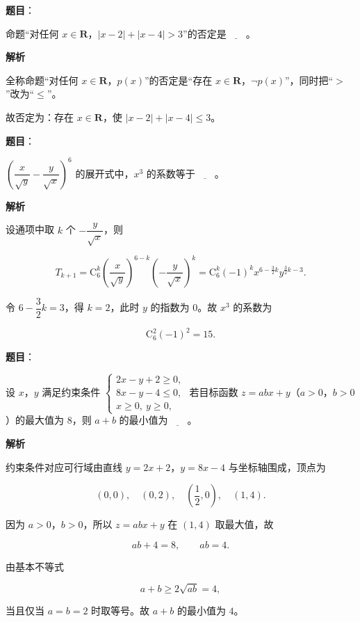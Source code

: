 \begin{answer}

\textbf{题目}：

命题“对任何 $x\in\mathbf R$，$|x-2|+|x-4|>3$”的否定是$\underline{\qquad}$。

\textbf{解析}

全称命题“对任何 $x\in\mathbf R$，$p(x)$”的否定是“存在 $x\in\mathbf R$，$\lnot p(x)$”，同时把“$>$”改为“$\leqslant$”。

故否定为：存在 $x\in\mathbf R$，使 $|x-2|+|x-4|\leqslant3$。


\end{answer}
\begin{answer}

\textbf{题目}：

$\left(\dfrac{x}{\sqrt y}-\dfrac{y}{\sqrt x}\right)^6$ 的展开式中，$x^3$ 的系数等于$\underline{\qquad}$。

\textbf{解析}

设通项中取 $k$ 个 $-\dfrac{y}{\sqrt x}$，则

\nopagebreak[4]
\[T_{k+1}=\mathrm C_6^k\left(\frac{x}{\sqrt y}\right)^{6-k}\left(-\frac{y}{\sqrt x}\right)^k
=\mathrm C_6^k(-1)^k x^{6-\frac32k}y^{\frac32k-3}.\]

令 $6-\dfrac32k=3$，得 $k=2$，此时 $y$ 的指数为 $0$。故 $x^3$ 的系数为

\nopagebreak[4]
\[\mathrm C_6^2(-1)^2=15.\]


\end{answer}
\begin{answer}

\textbf{题目}：

设 $x$，$y$ 满足约束条件 $\begin{cases}2x-y+2\geqslant0,\\ 8x-y-4\leqslant0,\\ x\geqslant0,\ y\geqslant0,\end{cases}$ 若目标函数 $z=abx+y$（$a>0$，$b>0$）的最大值为 $8$，则 $a+b$ 的最小值为$\underline{\qquad}$。

\textbf{解析}

约束条件对应可行域由直线 $y=2x+2$，$y=8x-4$ 与坐标轴围成，顶点为

\nopagebreak[4]
\[(0,0),\quad(0,2),\quad\left(\frac12,0\right),\quad(1,4).\]

因为 $a>0$，$b>0$，所以 $z=abx+y$ 在 $(1,4)$ 取最大值，故

\nopagebreak[4]
\[ab+4=8,\qquad ab=4.\]

由基本不等式

\nopagebreak[4]
\[a+b\geqslant2\sqrt{ab}=4,\]

当且仅当 $a=b=2$ 时取等号。故 $a+b$ 的最小值为 $4$。


\end{answer}
